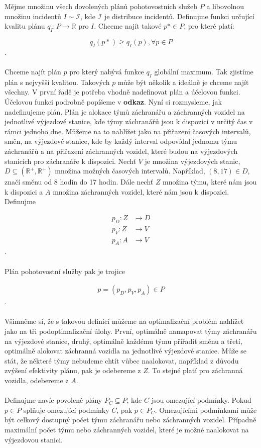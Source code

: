 Mějme množinu všech dovolených plánů pohotovostních služeb $P$ a libovolnou množinu incidentů $I \sim \mathcal{I}$, kde $\mathcal{I}$ je distribuce incidentů. 
Definujme funkci určující kvalitu plánu $q_I\colon P \rightarrow \mathbb{R}$ pro $I$.
Chceme najít takové $p* \in P$, pro které platí:

$$
q_I(p*) \geq q_I(p), \forall p \in P
$$
.
\\
\\
Chceme najít plán $p$ pro který nabývá funkce $q_I$ globální maximum. Tak zjistíme plán s nejvyšší kvalitou.
Takových $p$ může být několik a ideálně je chceme najít všechny.
V první řadě je potřeba vhodně nadefinovat plán a účelovou funkci. 
Účelovou funkci podrobně popíšeme v %
\textbf{odkaz}.
Nyní si rozmysleme, jak nadefinujeme plán.
Plán je alokace týmů záchranářu a záchranných vozidel na jednotlivé výjezdové stanice, kde týmy záchranářů jsou k dispozici v určitý čas v rámci jednoho dne.
Můžeme na to nahlížet jako na přiřazení časových intervalů, směn, na výjezdové stanice, kde by každý interval odpovídal jednomu týmu záchranářů a na přiřazení záchranných vozidel,
které budou na výjezdových stanicích pro záchranáře k dispozici.
Nechť $V$ je množina výjezdových stanic, $D \subseteq (\mathbb{R^+}, \mathbb{R^+})$ množina možných časových intervalů.
Například, $(8, 17) \in D$, značí směnu od 8 hodin do 17 hodin.
Dále nechť $Z$ množina týmu, které nám jsou k dispozici a $A$ množina záchranných vozidel, které nám jsou k dispozici. Definujme

\begin{align}
p_D \colon Z &\rightarrow D \\
p_V \colon Z &\rightarrow V \\
p_A \colon A &\rightarrow V 
\end{align}
.
\\
\\
Plán pohotovostní služby pak je trojice

\begin{align}
p = (p_D, p_V, p_A) \in P
\end{align}
.
\\
\\
Všimněme si, že s takovou definicí můžeme na optimalizační problém nahlížet jako na tři podoptimalizační úlohy.
První, optimálně namapovat týmy záchranářu na výjezdové stanice, druhý, optimálně každému týmu přiřadit směnu a třetí, optimálně alokovat záchranná vozidla na jednotlivé výjezdové stanice.
Může se stát, že některé týmy nebudeme chtít vůbec naalokovat, například z důvodu zvýšení efektivity plánu, pak je odebereme z $Z$. To stejné platí pro záchranná vozidla, odebereme z $A$.
\\
\\
Definujme navíc povolené plány $P_C \subseteq P$, kde $C$ jsou omezující podmínky. Pokud $p \in P$ splňuje omezující podmínky $C$, pak $p \in P_C$. 
Omezujícími podmínkamí může být celkový dostupný počet týmu záchranářu nebo záchranných vozidel. Případně maximální počet týmu nebo záchranných vozidel, které je možné naalokovat na výjezdovou stanici.

